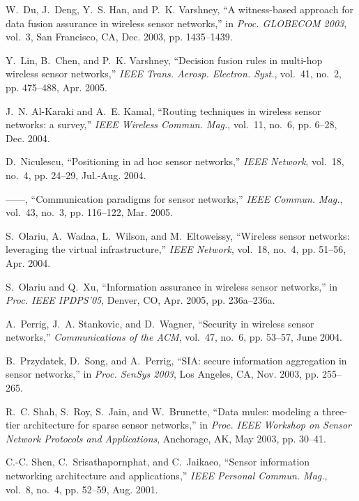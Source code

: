 \documentclass[12pt, onecolumn, draftcls]{IEEEtran}
\begin{document}
\begin{thebibliography}{10}
W.~Du, J.~Deng, Y.~S. Han, and P.~K. Varshney, ``A witness-based
approach for
  data fusion assurance in wireless sensor networks,'' in \emph{Proc. GLOBECOM
  2003}, vol.~3, San Francisco, CA, Dec. 2003, pp. 1435--1439.

Y.~Lin, B.~Chen, and P.~K. Varshney, ``Decision fusion rules in
multi-hop
  wireless sensor networks,'' \emph{{IEEE} Trans. Aerosp. Electron. Syst.},
  vol.~41, no.~2, pp. 475--488, Apr. 2005.

J.~N. \mbox{Al-Karaki} and A.~E. Kamal, ``Routing techniques in
wireless sensor
  networks: a survey,'' \emph{{IEEE} Wireless Commun. Mag.}, vol.~11, no.~6,
  pp. 6--28, Dec. 2004.

D.~Niculescu, ``Positioning in ad hoc sensor networks,''
\emph{{IEEE} Network},
  vol.~18, no.~4, pp. 24--29, Jul.-Aug. 2004.

------, ``Communication paradigms for sensor networks,'' \emph{{IEEE} Commun.
  Mag.}, vol.~43, no.~3, pp. 116--122, Mar. 2005.

S.~Olariu, A.~Wadaa, L.~Wilson, and M.~Eltoweissy, ``Wireless sensor
networks:
  leveraging the virtual infrastructure,'' \emph{{IEEE} Network}, vol.~18,
  no.~4, pp. 51--56, Apr. 2004.

S.~Olariu and Q.~Xu, ``Information assurance in wireless sensor
networks,'' in
  \emph{Proc. IEEE IPDPS'05}, Denver, CO, Apr. 2005, pp. 236a--236a.

A.~Perrig, J.~A. Stankovic, and D.~Wagner, ``Security in wireless
sensor
  networks,'' \emph{Communications of the ACM}, vol.~47, no.~6, pp. 53--57,
  June 2004.

B.~Przydatek, D.~Song, and A.~Perrig, ``\mbox{SIA}: secure
information
  aggregation in sensor networks,'' in \emph{Proc. SenSys 2003}, Los Angeles,
  CA, Nov. 2003, pp. 255--265.

R.~C. Shah, S.~Roy, S.~Jain, and W.~Brunette, ``Data mules: modeling
a
  three-tier architecture for sparse sensor networks,'' in \emph{Proc. IEEE
  Workshop on Sensor Network Protocols and Applications}, Anchorage, AK, May
  2003, pp. 30--41.

C.-C. Shen, C.~Srisathapornphat, and C.~Jaikaeo, ``Sensor
information
  networking architecture and applications,'' \emph{{IEEE} Personal Commun.
  Mag.}, vol.~8, no.~4, pp. 52--59, Aug. 2001.


\end{thebibliography}
\end{document}
